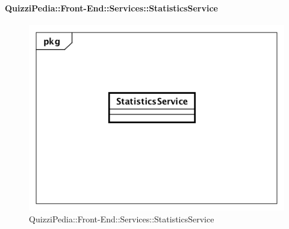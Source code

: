 \paragraph{QuizziPedia::Front-End::Services::StatisticsService}
\begin{figure}
	\centering
	\includegraphics[scale=0.45]{UML/Classi/Front-End/QuizziPedia_Front-end_Services_ StatisticsService.png}
	\caption{QuizziPedia::Front-End::Services::StatisticsService}
\end{figure}
